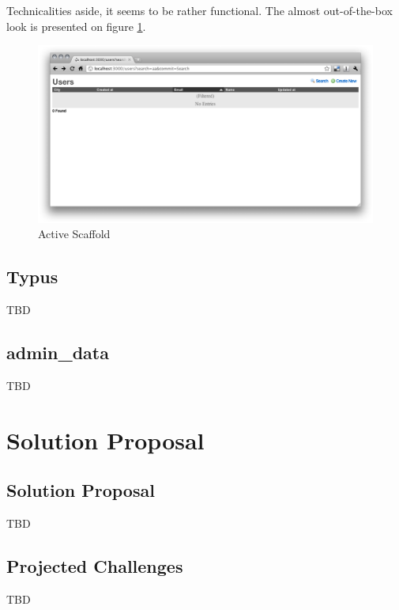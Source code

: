       Technicalities aside, it seems to be rather functional. The almost out-of-the-box look is presented on figure \ref{activescaffold1}.
      \begin{figure}[h]
    		\begin{center}
    			\includegraphics[width=\linewidth]{images/chapter01/activescaffold1.png}
    			\caption{Active Scaffold}
    			\label{activescaffold1}
    		\end{center}
    	\end{figure}

    \subsection{Typus}
      TBD
  
    \subsection{admin\_data}
      TBD
    
  
  
  \section{Solution Proposal}
    \subsection{Solution Proposal}
    TBD
  
    \subsection{Projected Challenges}
    TBD